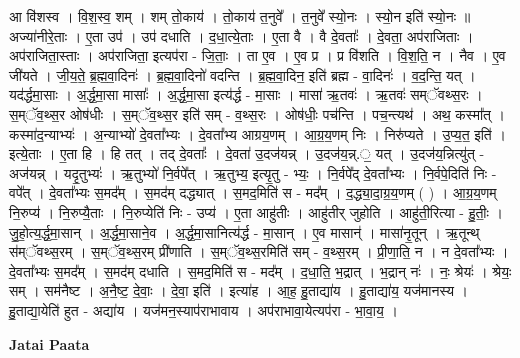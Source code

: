 \documentclass[17pt]{extarticle}
\begin{document}
आ वि॑शस्व । वि॒श॒स्व॒ शम् । शम् तो॒काय॑ । तो॒काय॑ त॒नुवे᳚ । त॒नुवे᳚ स्यो॒नः । स्यो॒न इति॑ स्यो॒नः ॥ अज्या॑नीरे॒ताः । ए॒ता उप॑ । उप॑ दधाति । द॒धा॒त्ये॒ताः । ए॒ता वै । वै दे॒वताः᳚ । दे॒वता॒ अप॑राजिताः । अप॑राजिता॒स्ताः । अप॑राजिता॒ इत्यप॑रा - जि॒ताः॒ । ता ए॒व । ए॒व प्र । प्र वि॑शति । वि॒श॒ति॒ न । नैव । ए॒व जी॑यते । जी॒य॒ते॒ ब्र॒ह्म॒वा॒दिनः॑ । ब्र॒ह्म॒वा॒दिनो॑ वदन्ति । ब्र॒ह्म॒वा॒दिन॒ इति॑ ब्रह्म - वा॒दिनः॑ । व॒द॒न्ति॒ यत् । यद॑र्द्धमा॒साः । अ॒र्द्ध॒मा॒सा मासाः᳚ । अ॒र्द्ध॒मा॒सा इत्य॑र्द्ध - मा॒साः । मासा॑ ऋ॒तवः॑ । ऋ॒तवः॑ सम्ॅवथ्स॒रः । स॒म्ॅव॒थ्स॒र ओष॑धीः । स॒म्ॅव॒थ्स॒र इति॑ सम् - व॒थ्स॒रः । ओष॑धीः॒ पच॑न्ति । पच॒न्त्यथ॑ । अथ॒ कस्मा᳚त् । कस्मा॑द॒न्याभ्यः॑ । अ॒न्याभ्यो॑ दे॒वता᳚भ्यः । दे॒वता᳚भ्य आग्रय॒णम् । आ॒ग्र॒य॒णम् निः । निरु॑प्यते । उ॒प्य॒त॒ इति॑ । इत्ये॒ताः । ए॒ता हि । हि तत् । तद् दे॒वताः᳚ । दे॒वता॑ उ॒दज॑यन्न् । उ॒दज॑य॒न्न्.॒ यत् । उ॒दज॑य॒न्नित्यु॑त् - अज॑यन्न् । यदृ॒तुभ्यः॑ । ऋ॒तुभ्यो॑ नि॒र्वपे᳚त् । ऋ॒तुभ्य॒ इत्यृ॒तु - भ्यः॒ । नि॒र्वपे᳚द् दे॒वता᳚भ्यः । नि॒र्वपे॒दिति॑ निः - वपे᳚त् । दे॒वता᳚भ्यः स॒मद᳚म् । स॒मद॑म् दद्ध्यात् । स॒मद॒मिति॑ स - मद᳚म् । द॒द्ध्या॒दा॒ग्र॒य॒णम् ( ) । आ॒ग्र॒य॒णम् नि॒रुप्य॑ । नि॒रुप्यै॒ताः । नि॒रुप्येति॑ निः - उप्य॑ । ए॒ता आहु॑तीः । आहु॑तीर् जुहोति । आहु॑ती॒रित्या - हु॒तीः॒ । जु॒हो॒त्य॒र्द्ध॒मा॒सान् । अ॒र्द्ध॒मा॒साने॒व । अ॒र्द्ध॒मा॒सानित्य॑र्द्ध - मा॒सान् । ए॒व मासान्॑ । मासा॑नृ॒तून् । ऋ॒तून्थ् स॑म्ॅवथ्स॒रम् । स॒म्ॅव॒थ्स॒रम् प्री॑णाति । स॒म्ॅव॒थ्स॒रमिति॑ सम् - व॒थ्स॒रम् । प्री॒णा॒ति॒ न । न दे॒वता᳚भ्यः । दे॒वता᳚भ्यः स॒मद᳚म् । स॒मद॑म् दधाति । स॒मद॒मिति॑ स - मद᳚म् । द॒धा॒ति॒ भ॒द्रात् । भ॒द्रान् नः॑ । नः॒ श्रेयः॑ । श्रेयः॒ सम् । सम॑नैष्ट । अ॒नै॒ष्ट॒ दे॒वाः॒ । दे॒वा॒ इति॑ । इत्या॑ह । आ॒ह॒ हु॒ताद्या॑य । हु॒ताद्या॑य॒ यज॑मानस्य । हु॒ताद्या॒येति॑ हुत - अद्या॑य । यज॑मन॒स्याप॑राभावाय । अप॑राभावा॒येत्यप॑रा - भा॒वा॒य॒ । \newline

\textbf{Jatai Paata} \newline
\end{document}
